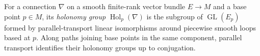
For a connection $\nabla$ on a smooth finite-rank vector bundle $E\to M$ and a base point $p\in M$, its \emph{holonomy group} $\operatorname{Hol}_p(\nabla)$ is the subgroup of $\operatorname{GL}(E_p)$ formed by parallel-transport linear isomorphisms around piecewise smooth loops based at $p$. Along paths joining base points in the same component, parallel transport identifies their holonomy groups up to conjugation.
